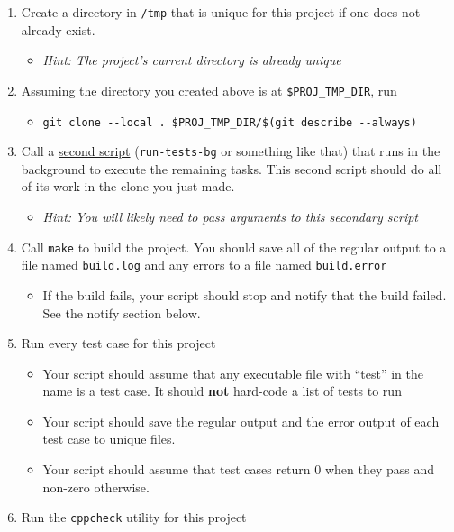 \documentclass{article}
\begin{document}
\begin{enumerate}
    \item Create a directory in \texttt{/tmp} that is unique for this project if one does not already exist.
    \begin{itemize}
      \item \small \em Hint: The project's current directory is already unique
    \end{itemize}
  \item Assuming the directory you created above is at \texttt{\$PROJ\_TMP\_DIR}, run
    \begin{itemize}
      \item \texttt{git clone -{}-local .\ \$PROJ\_TMP\_DIR/\$(git describe -{}-always)}
    \end{itemize}
\item Call a \ul{second script} (\texttt{run-tests-bg} or something like that) that runs in the background to execute the
    remaining tasks. This second script should do all of its work in the clone
    you just made.
    \begin{itemize}
      \item \small \em Hint: You will likely need to pass arguments to this secondary script
    \end{itemize}
  \item Call \texttt{make} to build the project. You should save all of the
    regular output to a file named \texttt{build.log} and any errors to a file
    named \texttt{build.error}
    \begin{itemize}
      \item If the build fails, your script should stop and notify that the
        build failed. See the notify section below.
    \end{itemize}
  \item Run every test case for this project
    \begin{itemize}
      \item Your script should assume that any executable file with ``test''
        in the name is a test case. It should \textbf{not} hard-code a list of
        tests to run
      \item Your script should save the regular output and the error output of
        each test case to unique files.
      \item Your script should assume that test cases return 0 when they
        pass and non-zero otherwise.
    \end{itemize}
        \pagebreak
  \item Run the \texttt{cppcheck} utility for this project

\end{enumerate}
\end{document}
